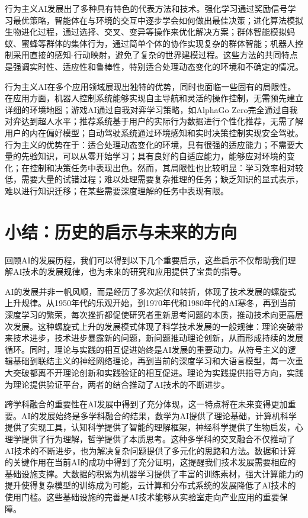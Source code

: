 行为主义AI发展出了多种具有特色的代表方法和技术。强化学习通过奖励信号学习最优策略，智能体在与环境的交互中逐步学会如何做出最佳决策；进化算法模拟生物进化过程，通过选择、交叉、变异等操作来优化解决方案；群体智能模拟蚂蚁、蜜蜂等群体的集体行为，通过简单个体的协作实现复杂的群体智能；机器人控制采用直接的感知-行动映射，避免了复杂的世界建模过程。这些方法的共同特点是强调实时性、适应性和鲁棒性，特别适合处理动态变化的环境和不确定的情况。

行为主义AI在多个应用领域展现出独特的优势，同时也面临一些固有的局限性。在应用方面，机器人控制系统能够实现自主导航和灵活的操作控制，无需预先建立详细的环境地图；游戏AI通过自我对弈学习策略，如AlphaGo Zero完全通过自我对弈达到超人水平；推荐系统基于用户的实际行为数据进行个性化推荐，无需了解用户的内在偏好模型；自动驾驶系统通过环境感知和实时决策控制实现安全驾驶。行为主义的优势在于：适合处理动态变化的环境，具有很强的适应能力；不需要大量的先验知识，可以从零开始学习；具有良好的自适应能力，能够应对环境的变化；在控制和决策任务中表现出色。然而，其局限性也比较明显：学习效率相对较低，需要大量的试错过程；难以处理需要复杂推理的任务；缺乏知识的显式表示，难以进行知识迁移；在某些需要深度理解的任务中表现有限。

\section{小结：历史的启示与未来的方向}

回顾AI的发展历程，我们可以得到以下几个重要启示，这些启示不仅帮助我们理解AI技术的发展规律，也为未来的研究和应用提供了宝贵的指导。

AI的发展并非一帆风顺，而是经历了多次起伏和转折，体现了技术发展的螺旋式上升规律。从1950年代的乐观开始，到1970年代和1980年代的AI寒冬，再到当前深度学习的繁荣，每次挫折都促使研究者重新思考问题的本质，推动技术向更高层次发展。这种螺旋式上升的发展模式体现了科学技术发展的一般规律：理论突破带来技术进步，技术进步暴露新的问题，新问题推动理论创新，从而形成持续的发展循环。同时，理论与实践的相互促进始终是AI发展的重要动力。从符号主义的逻辑基础到联结主义的神经网络理论，再到当前的深度学习和大语言模型，每一次重大突破都离不开理论创新和实践验证的相互促进。理论为实践提供指导方向，实践为理论提供验证平台，两者的结合推动了AI技术的不断进步。

跨学科融合的重要性在AI发展中得到了充分体现，这一特点将在未来变得更加重要。AI的发展始终是多学科融合的结果，数学为AI提供了理论基础，计算机科学提供了实现工具，认知科学提供了智能的理解框架，神经科学提供了生物启发，心理学提供了行为理解，哲学提供了本质思考。这种多学科的交叉融合不仅推动了AI技术的不断进步，也为解决复杂问题提供了多元化的思路和方法。数据和计算的关键作用在当前AI的成功中得到了充分证明，这提醒我们技术发展需要相应的基础设施支撑。大数据的积累为机器学习提供了丰富的训练素材，强大计算能力的提升使得复杂模型的训练成为可能，云计算和分布式系统的发展降低了AI技术的使用门槛。这些基础设施的完善是AI技术能够从实验室走向产业应用的重要保障。

